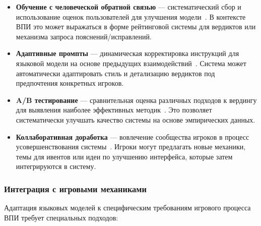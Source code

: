 \begin{itemize}
    \item \textbf{Обучение с человеческой обратной связью} — систематический сбор и использование оценок пользователей для улучшения модели~\cite{bai2022training}. В контексте ВПИ это может выражаться в форме рейтинговой системы для вердиктов или механизма запроса пояснений/исправлений.

    \item \textbf{Адаптивные промпты} — динамическая корректировка инструкций для языковой модели на основе предыдущих взаимодействий~\cite{madaan2022memory}. Система может автоматически адаптировать стиль и детализацию вердиктов под предпочтения конкретных игроков.

    \item \textbf{A/B тестирование} — сравнительная оценка различных подходов к вердингу для выявления наиболее эффективных методик~\cite{kohavi2020trustworthy}. Это позволяет систематически улучшать качество системы на основе эмпирических данных.

    \item \textbf{Коллаборативная доработка} — вовлечение сообщества игроков в процесс усовершенствования системы~\cite{kirk2023past}. Игроки могут предлагать новые механики, темы для ивентов или идеи по улучшению интерфейса, которые затем интегрируются в систему.
\end{itemize}

\subsubsection{Интеграция с игровыми механиками}

Адаптация языковых моделей к специфическим требованиям игрового процесса ВПИ требует специальных подходов:

